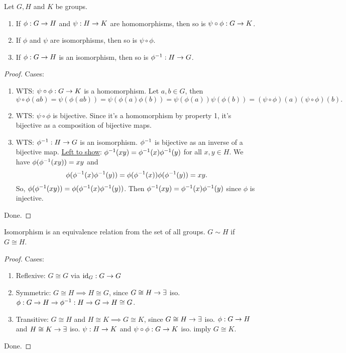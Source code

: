 \documentclass[]{article}
\begin{document}
\begin{theorem}
	Let $G,H$ and $K$ be groups.
	\begin{enumerate}
		\item If $\phi:G\rightarrow H$ and $\psi:H\rightarrow K$ are homomorphisms, then so is $\psi\circ\phi:G\rightarrow K$.
		\item If $\phi$ and $\psi$ are isomorphisms, then so is $\psi\circ\phi$.
		\item If $\phi:G\rightarrow H$ is an isomorphism, then so is $\phi^{-1}:H\rightarrow G$.
	\end{enumerate}
\end{theorem}
\begin{proof}
	Cases:
	\begin{enumerate}
		\item WTS: $\psi\circ\phi:G\rightarrow K$ is a homomorphism.
			Let $a,b\in G$, then $$\psi\circ\phi(ab) = \psi(\phi(ab)) = \psi(\phi(a)\phi(b)) = \psi(\phi(a))\psi(\phi(b)) = (\psi\circ\phi)(a)(\psi\circ\phi)(b).$$
		\item WTS: $\psi\circ\phi$ is bijective.
			Since it's a homomorphism by property 1, it's bijective as a composition of bijective maps.
		\item WTS: $\phi^{-1}:H\rightarrow G$ is an isomorphism.
			$\phi^{-1}$ is bijective as an inverse of a bijective map.
			\ul{Left to show}: $\phi^{-1}(xy) = \phi^{-1}(x)\phi^{-1}(y)$ for all $x,y\in H$.
			We have $\phi(\phi^{-1}(xy)) = xy$ and $$\phi(\phi^{-1}(x)\phi^{-1}(y)) = \phi(\phi^{-1}(x))\phi(\phi^{-1}(y)) = xy.$$
			So, $\phi(\phi^{-1}(xy)) = \phi(\phi^{-1}(x)\phi^{-1}(y))$.
			Then $\phi^{-1}(xy) = \phi^{-1}(x)\phi^{-1}(y)$ since $\phi$ is injective.
	\end{enumerate}
	Done.
\end{proof}


\begin{theorem}
	Isomorphism is an equivalence relation from the set of all groups.
	$G\sim H$ if $G\cong H$.
\end{theorem}
\begin{proof}
	Cases:
	\begin{enumerate}
		\item Reflexive: $G\cong G$ via $\text{id}_G:G\rightarrow G$
		\item Symmetric: $G\cong H\implies H\cong G$, since $G\cong H\rightarrow \exists$ iso. $\phi:G\rightarrow H \rightarrow \phi^{-1}:H\rightarrow G \rightarrow H\cong G$.
		\item Transitive: $G\cong H$ and $H\cong K \implies G\cong K$, since $G\cong H \rightarrow \exists$ iso. $\phi:G\rightarrow H$ and $H\cong K\rightarrow \exists$ iso. $\psi:H\rightarrow K$ and $\psi\circ\phi:G\rightarrow K$ iso. imply $G\cong K$.
	\end{enumerate}
	Done.
\end{proof}
\end{document}
